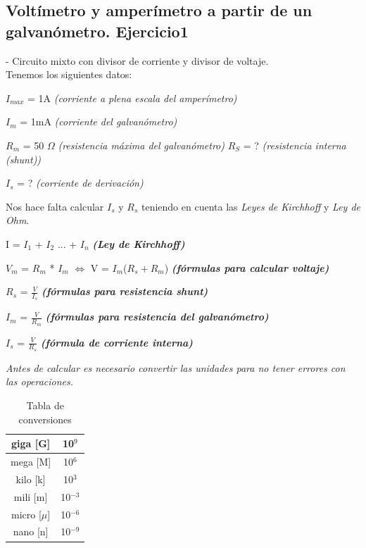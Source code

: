 \documentclass[a4paper,11pt]{article}
\begin{document}
\subsection{Voltímetro y amperímetro a partir de un galvanómetro. Ejercicio1}
- Circuito mixto con divisor de corriente y divisor de voltaje. \vspace{0.5cm}\\
\noindent Tenemos los siguientes datos:
\begin{center}
    $I_{max}$ = 1A \textit{(corriente a plena escala del amperímetro)}

    $I_m$ = 1mA \textit{(corriente del galvanómetro)}

    $R_m$ = 50 $\Omega$ \textit{(resistencia máxima del galvanómetro)}
    $R_S$ = ? \textit{(resistencia interna (shunt))}

    $I_s$ = ? \textit{(corriente de derivación)}
\end{center}
\noindent Nos hace falta calcular $I_s$ y $R_s$ teniendo en cuenta las \textit{Leyes de Kirchhoff} y \textit{Ley de Ohm}.
\begin{center}
    
    I = $I_1$ + $I_2$ ... + $I_n$ \textcolor[cmyk]{1,0,1,0}{\textbf{\textit{(Ley de Kirchhoff)}}}
    
    $V_m$ = $R_m$ * $I_m$ $\Leftrightarrow$   V = $I_m$($R_s + R_m$) \textcolor[cmyk]{1,0,1,0}{\textbf{\textit{(fórmulas para calcular voltaje)}}}
    
    $R_s$ = $\frac{V}{I_s}$ \textcolor[cmyk]{1,0,1,0}{\textbf{\textit{(fórmulas para resistencia shunt)}}}

    $I_m$ = $\frac{V}{R_m}$ \textcolor[cmyk]{1,0,1,0}{\textbf{\textit{(fórmulas para resistencia del galvanómetro)}}}

    $I_s$ = $\frac{V}{R_s}$ \textcolor[cmyk]{1,0,1,0}{\textbf{\textit{(fórmula de corriente interna)}}}
\end{center}
\textit{Antes de calcular es necesario convertir las unidades para no tener errores con las operaciones.}

\begin{table}[H]
    \centering
    \begin{tabular}{|c|c|} \hline
        giga [G] & 10$^{9}$ \\ \hline
        mega [M] & 10$^{6}$ \\ \hline
        kilo [k] & 10$^{3}$ \\ \hline
        mili [m] & 10$^{-3}$ \\ \hline
        micro [$\mu$] & 10$^{-6}$ \\ \hline
        nano [n] & 10$^{-9}$ \\ \hline
    \end{tabular}
    \caption{Tabla de conversiones}\label{tabla 1}
\end{table}
\end{document}
